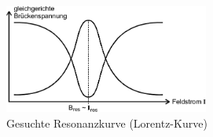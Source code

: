 \begin{figure}[h!]
	\centering
	\includegraphics[width=0.6\textwidth]{Anleitung_Abb10.pdf}
	\caption[Resonanzkurve]{Gesuchte Resonanzkurve (Lorentz-Kurve) \cite{V28}}
	\label{fig:kurve}
\end{figure}
